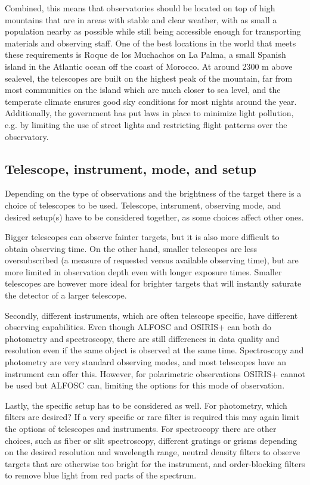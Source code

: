 \documentclass[a4paper,oneside,12pt, class=Latex/Classes/PhDthesisPSnPDF, crop=false]{standalone}
\begin{document}
Combined, this means that observatories should be located on top of high mountains that are in areas with stable and clear weather, with as small a population nearby as possible while still being accessible enough for transporting materials and observing staff. One of the best locations in the world that meets these requirements is Roque de los Muchachos on La Palma, a small Spanish island in the Atlantic ocean off the coast of Morocco. At around 2300 m above sealevel, the telescopes are built on the highest peak of the mountain, far from most communities on the island which are much closer to sea level, and the temperate climate ensures good sky conditions for most nights around the year. Additionally, the government has put laws in place to minimize light pollution, e.g. by limiting the use of street lights and restricting flight patterns over the observatory.


\subsection{Telescope, instrument, mode, and setup}
Depending on the type of observations and the brightness of the target there is a choice of telescopes to be used. Telescope, intsrument, observing mode, and desired setup(s) have to be considered together, as some choices affect other ones.

Bigger telescopes can observe fainter targets, but it is also more difficult to obtain observing time. On the other hand, smaller telescopes are less oversubscribed (a measure of requested versus available observing time), but are more limited in observation depth even with longer exposure times. Smaller telescopes are however more ideal for brighter targets that will instantly saturate the detector of a larger telescope.

Secondly, different instruments, which are often telescope specific, have different observing capabilities. Even though ALFOSC and OSIRIS+ can both do photometry and spectroscopy, there are still differences in data quality and resolution even if the same object is observed at the same time. Spectroscopy and photometry are very standard observing modes, and most telescopes have an instrument can offer this. However, for polarimetric observations OSIRIS+ cannot be used but ALFOSC can, limiting the options for this mode of observation.

Lastly, the specific setup has to be considered as well. For photometry, which filters are desired? If a very specific or rare filter is required this may again limit the options of telescopes and instruments. For spectrocopy there are other choices, such as fiber or slit spectroscopy, different gratings or grisms depending on the desired resolution and wavelength range, neutral density filters to observe targets that are otherwise too bright for the instrument, and order-blocking filters to remove blue light from red parts of the spectrum.
\end{document}
